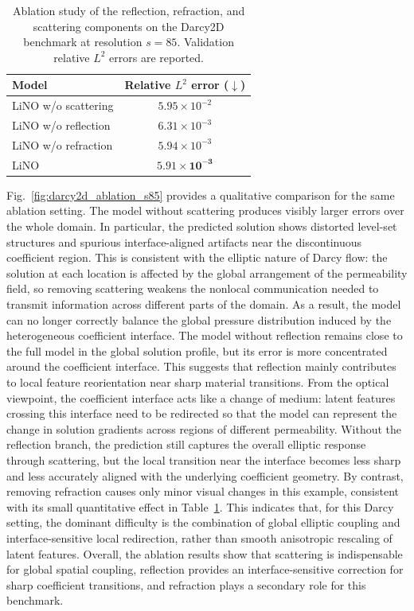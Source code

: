 \documentclass{article}
\begin{document}
\begin{table}[t]
    \centering
    \caption{
    Ablation study of the reflection, refraction, and scattering components on the Darcy2D benchmark at resolution $s=85$.
    Validation relative $L^2$ errors are reported.
    }
    \label{tab:darcy2d_ablation_s85}
    \begin{tabular}{lc}
        \toprule
        Model & Relative $L^2$ error ($\downarrow$) \\
        \midrule
        LiNO w/o scattering  & $5.95 \times 10^{-2}$ \\
        LiNO w/o reflection  & $6.31 \times 10^{-3}$ \\
        LiNO w/o refraction  & $5.94 \times 10^{-3}$ \\
        \midrule
        \rowcolor{gray!12}
        LiNO                 & $\mathbf{5.91 \times 10^{-3}}$ \\
        \bottomrule
    \end{tabular}
\end{table}

Fig.~\ref{fig:darcy2d_ablation_s85} provides a qualitative comparison for the same ablation setting. 
The model without scattering produces visibly larger errors over the whole domain. 
In particular, the predicted solution shows distorted level-set structures and spurious interface-aligned artifacts near the discontinuous coefficient region. 
This is consistent with the elliptic nature of Darcy flow: the solution at each location is affected by the global arrangement of the permeability field, so removing scattering weakens the nonlocal communication needed to transmit information across different parts of the domain. 
As a result, the model can no longer correctly balance the global pressure distribution induced by the heterogeneous coefficient interface.
The model without reflection remains close to the full model in the global solution profile, but its error is more concentrated around the coefficient interface. 
This suggests that reflection mainly contributes to local feature reorientation near sharp material transitions. 
From the optical viewpoint, the coefficient interface acts like a change of medium: latent features crossing this interface need to be redirected so that the model can represent the change in solution gradients across regions of different permeability. 
Without the reflection branch, the prediction still captures the overall elliptic response through scattering, but the local transition near the interface becomes less sharp and less accurately aligned with the underlying coefficient geometry.
By contrast, removing refraction causes only minor visual changes in this example, consistent with its small quantitative effect in Table~\ref{tab:darcy2d_ablation_s85}. 
This indicates that, for this Darcy setting, the dominant difficulty is the combination of global elliptic coupling and interface-sensitive local redirection, rather than smooth anisotropic rescaling of latent features. 
Overall, the ablation results show that scattering is indispensable for global spatial coupling, reflection provides an interface-sensitive correction for sharp coefficient transitions, and refraction plays a secondary role for this benchmark.
\end{document}
